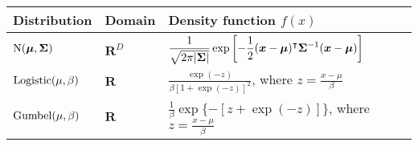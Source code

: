\begin{tabularx}{\linewidth}{llX}
	Distribution & Domain & Density function $f(x)$ \\
	\midrule
	$\mathrm{N}( \bm{\mu}, \bm{\Sigma} )$
    & $\mathbf{R}^D$
	  & $\displaystyle \frac{1}{\sqrt{2 \pi \lvert\bm{\Sigma}\rvert}}
	      \exp \left[ -\frac{1}{2} (\bm{x} - \bm{\mu})^\intercal \bm{\Sigma}^{-1} (\bm{x} - \bm{\mu}) \right] $ \\
	\rule{0pt}{5ex}%
	$\mathrm{Logistic}( \mu, \beta )$
	  & $\mathbf{R}$
    & $\displaystyle \frac{\exp(-z)}{\beta \left[1 + \exp(-z) \right]^2}$, where $\displaystyle z = \frac{x - \mu}{\beta}$ \\
	\rule{0pt}{5ex}%
	$\mathrm{Gumbel}( \mu, \beta )$
	  & $\mathbf{R}$
	  & $\displaystyle \frac{1}{\beta} \exp \{ - [z + \exp(-z)]\}$, where $\displaystyle z = \frac{x - \mu}{\beta}$ \\
\end{tabularx}

\endgroup
